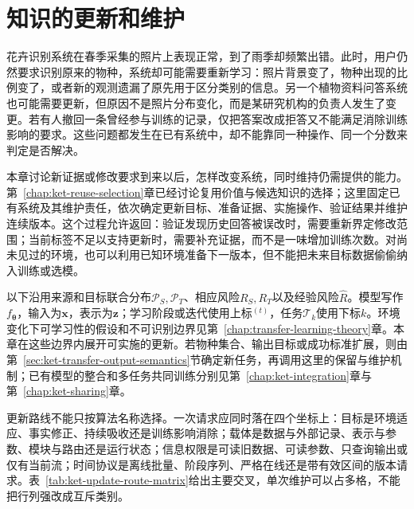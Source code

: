 \chapter{知识的更新和维护}
\label{chap:ket-update-maintenance}

花卉识别系统在春季采集的照片上表现正常，到了雨季却频繁出错。此时，用户仍然要求识别原来的物种，系统却可能需要重新学习：照片背景变了，物种出现的比例变了，或者新的观测遗漏了原先用于区分类别的信息。另一个植物资料问答系统也可能需要更新，但原因不是照片分布变化，而是某研究机构的负责人发生了变更。若有人撤回一条曾经参与训练的记录，仅把答案改成拒答又不能满足消除训练影响的要求。这些问题都发生在已有系统中，却不能靠同一种操作、同一个分数来判定是否解决。

本章讨论新证据或修改要求到来以后，怎样改变系统，同时维持仍需提供的能力。第~\ref{chap:ket-reuse-selection}章已经讨论复用价值与候选知识的选择；这里固定已有系统及其维护责任，依次确定更新目标、准备证据、实施操作、验证结果并维护连续版本。这个过程允许返回：验证发现历史回答被误改时，需要重新界定修改范围；当前标签不足以支持更新时，需要补充证据，而不是一味增加训练次数。对尚未见过的环境，也可以利用已知环境准备下一版本，但不能把未来目标数据偷偷纳入训练或选模。

以下沿用来源和目标联合分布$\mathcal P_S,\mathcal P_T$、相应风险$R_S,R_T$以及经验风险$\hat R$。模型写作$f_{\bm{\theta}}$，输入为$\bm{x}$，表示为$\bm{z}$；学习阶段或迭代使用上标$^{(t)}$，任务$\mathcal T_k$使用下标$k$。环境变化下可学习性的假设和不可识别边界见第~\ref{chap:transfer-learning-theory}章。本章在这些边界内展开可实施的更新。若物种集合、输出目标或成功标准扩展，则由第~\ref{sec:ket-transfer-output-semantics}节确定新任务，再调用这里的保留与维护机制；已有模型的整合和多任务共同训练分别见第~\ref{chap:ket-integration}章与第~\ref{chap:ket-sharing}章。

更新路线不能只按算法名称选择。一次请求应同时落在四个坐标上：目标是环境适应、事实修正、持续吸收还是训练影响消除；载体是数据与外部记录、表示与参数、模块与路由还是运行状态；信息权限是可读旧数据、可读参数、只查询输出或仅有当前流；时间协议是离线批量、阶段序列、严格在线还是带有效区间的版本请求。表~\ref{tab:ket-update-route-matrix}给出主要交叉，单次维护可以占多格，不能把行列强改成互斥类别。

